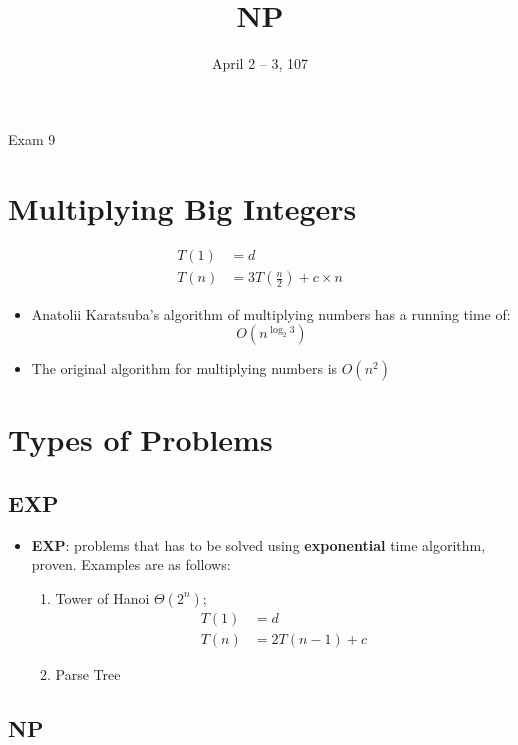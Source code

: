\documentclass{note}
\date{April 2 -- 3, 107}
\title{NP}
\begin{document}
\begin{note}{Exam 9}

\section{Multiplying Big Integers}

\begin{align*}
    T \left( 1 \right) &= d \\
    T \left( n \right) &= 3 T \left( \frac{n}{2} \right) + c \times n
\end{align*}

\begin{itemize}
    \item Anatolii Karatsuba's algorithm of multiplying numbers has a running time of:
    \begin{equation}
        O \left( n^{ \log_{2} 3 } \right)
    \end{equation}

    \item The original algorithm for multiplying numbers is $ O \left( n^{ 2 } \right) $
\end{itemize}

\section{Types of Problems}

    \subsection{EXP}

    \begin{itemize}
        \item \textbf{EXP}: problems that has to be solved using \textbf{exponential} time algorithm, proven. Examples are as follows:
        \begin{enumerate}
            \item Tower of Hanoi $ \Theta \left( 2^{n} \right) $;
            \begin{align*}
                T (1) &= d \\
                T (n) &= 2 T (n - 1) + c 
            \end{align*}
            \item Parse Tree
        \end{enumerate}
    \end{itemize}

    \subsection{NP}


\end{note}
\end{document}
